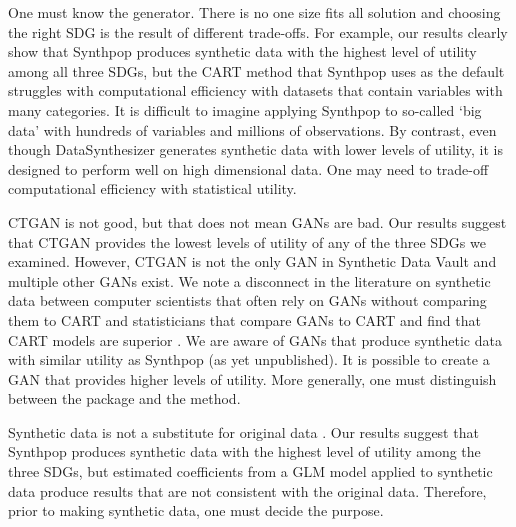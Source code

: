 \documentclass[runningheads]{llncs}
\begin{document}
One must know the generator.  There is no one size fits all solution and choosing the right SDG is the result of different trade-offs.  For example, our results clearly show that Synthpop produces synthetic data with the highest level of utility among all three SDGs, but the CART method that Synthpop uses as the default struggles with computational efficiency with datasets that contain variables with many categories.  It is difficult to imagine applying Synthpop to so-called `big data' with hundreds of variables and millions of observations.  By contrast, even though DataSynthesizer generates synthetic data with lower levels of utility, it is designed to perform well on high dimensional data.  One may need to trade-off computational efficiency with statistical utility.

CTGAN is not good, but that does not mean GANs are bad.  Our results suggest that CTGAN provides the lowest levels of utility of any of the three SDGs we examined.  However, CTGAN is not the only GAN in Synthetic Data Vault and multiple other GANs exist.  We note a disconnect in the literature on synthetic data between computer scientists that often rely on GANs without comparing them to CART and statisticians that compare GANs to CART and find that CART models are superior \cite{drechsler202330}.  We are aware of GANs that produce synthetic data with similar utility as Synthpop (as yet unpublished).  It is possible to create a GAN that provides higher levels of utility.  More generally, one must distinguish between the package and the method.  

Synthetic data is not a substitute for original data \cite{jordon2022synthetic}.  Our results suggest that Synthpop produces synthetic data with the highest level of utility among the three SDGs, but estimated coefficients from a GLM model applied to synthetic data produce results that are not consistent with the original data.  Therefore, prior to making synthetic data, one must decide the purpose.




\clearpage


\clearpage


\clearpage



\clearpage
\appendix

\end{document}
